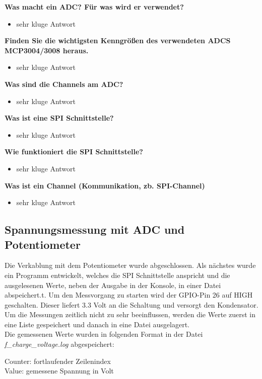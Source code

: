 \documentclass{article}
\begin{document}
\textbf{Was macht ein ADC? Für was wird er verwendet?}
\begin{itemize}
    \item sehr kluge Antwort
\end{itemize}
\textbf{Finden Sie die wichtigsten Kenngrößen des verwendeten ADCS MCP3004/3008 heraus.}
\begin{itemize}
    \item sehr kluge Antwort
\end{itemize}
\textbf{Was sind die Channels am ADC?}
\begin{itemize}
    \item sehr kluge Antwort
\end{itemize}
\textbf{Was ist eine SPI Schnittstelle?}
\begin{itemize}
    \item sehr kluge Antwort
\end{itemize}
\textbf{Wie funktioniert die SPI Schnittstelle?}
\begin{itemize}
    \item sehr kluge Antwort
\end{itemize}
\textbf{Was ist ein Channel (Kommunikation, zb. SPI-Channel)}
\begin{itemize}
    \item sehr kluge Antwort
\end{itemize}

\newpage

\subsection{Spannungsmessung mit ADC und Potentiometer}
Die Verkablung mit dem Potentiometer wurde abgeschlossen. Als nächstes wurde ein Programm entwickelt, 
welches die SPI Schnittstelle anspricht und die ausgelesenen Werte, neben der Ausgabe in der Konsole, in einer Datei abspeichert.t.
Um den Messvorgang zu starten wird der GPIO-Pin 26 auf HIGH geschalten. Dieser liefert 3.3 Volt an die Schaltung und versorgt den Kondensator.\\
Um die Messungen zeitlich nicht zu sehr beeinflussen, werden die Werte zuerst in eine Liste gespeichert und danach in eine Datei ausgelagert.\\
Die gemessenen Werte wurden in folgenden Format in der Datei \textit{f\_charge\_voltage.log} abgespeichert:

\noindent
Counter: fortlaufender Zeilenindex\\
Value: gemessene Spannung in Volt
\end{document}

